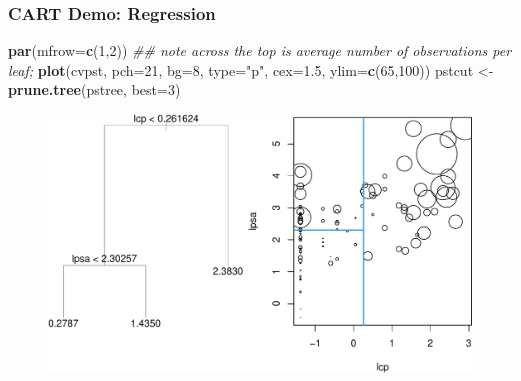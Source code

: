 \documentclass[
  shownotes,
  xcolor={svgnames},
  hyperref={colorlinks,citecolor=DarkBlue,linkcolor=DarkRed,urlcolor=DarkBlue}
  ]{beamer}
\newenvironment{Shaded}{\begin{snugshade}}{\end{snugshade}}
\newcommand{\CommentTok}[1]{\textcolor[rgb]{0.56,0.35,0.01}{\textit{#1}}}
\newcommand{\DataTypeTok}[1]{\textcolor[rgb]{0.13,0.29,0.53}{#1}}
\newcommand{\DecValTok}[1]{\textcolor[rgb]{0.00,0.00,0.81}{#1}}
\newcommand{\FloatTok}[1]{\textcolor[rgb]{0.00,0.00,0.81}{#1}}
\newcommand{\KeywordTok}[1]{\textcolor[rgb]{0.13,0.29,0.53}{\textbf{#1}}}
\newcommand{\NormalTok}[1]{#1}
\newcommand{\StringTok}[1]{\textcolor[rgb]{0.31,0.60,0.02}{#1}}
\begin{document}
\begin{frame}[fragile]
\frametitle{CART Demo: Regression}

\begin{scriptsize}
\begin{Shaded}
\begin{Highlighting}[]
\KeywordTok{par}\NormalTok{(}\DataTypeTok{mfrow=}\KeywordTok{c}\NormalTok{(}\DecValTok{1}\NormalTok{,}\DecValTok{2}\NormalTok{))}
\CommentTok{\#\# note across the top is \textquotesingle{}average number of observations per leaf\textquotesingle{}; }
\KeywordTok{plot}\NormalTok{(cvpst, }\DataTypeTok{pch=}\DecValTok{21}\NormalTok{, }\DataTypeTok{bg=}\DecValTok{8}\NormalTok{, }\DataTypeTok{type=}\StringTok{"p"}\NormalTok{, }\DataTypeTok{cex=}\FloatTok{1.5}\NormalTok{, }\DataTypeTok{ylim=}\KeywordTok{c}\NormalTok{(}\DecValTok{65}\NormalTok{,}\DecValTok{100}\NormalTok{))}
\NormalTok{pstcut \textless{}{-}}\StringTok{ }\KeywordTok{prune.tree}\NormalTok{(pstree, }\DataTypeTok{best=}\DecValTok{3}\NormalTok{)}

\end{Highlighting}
\end{Shaded}
\end{scriptsize}

\begin{figure}[H] \centering
            \captionsetup{justification=centering}
              \includegraphics[scale=0.55]{figures/unnamed-chunk-6-1.pdf}
 \end{figure}


\end{frame}
\end{document}
